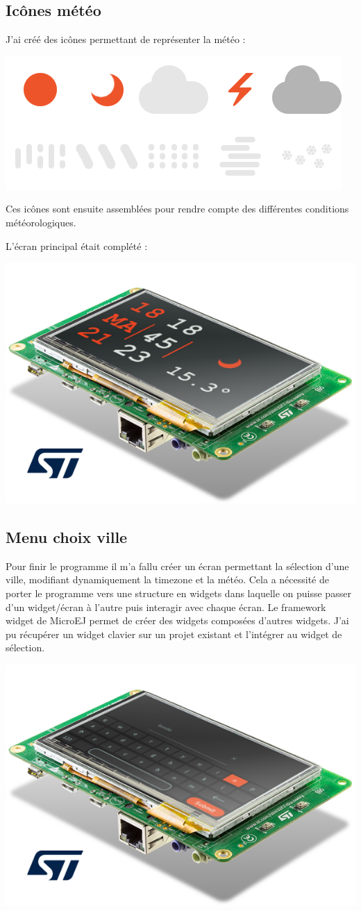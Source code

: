 \documentclass[french,a4paper,12pt]{report}
\begin{document}
\subsection{Icônes météo}

J'ai créé des icônes permettant de représenter la météo :

\begin{center}
\includegraphics[width=.5\textwidth]{./ressources/images/weathertogether.png}
\end{center}

Ces icônes sont ensuite assemblées pour rendre compte des différentes conditions météorologiques.

L'écran principal était complété :

\begin{center}
\includegraphics[width=.5\textwidth]{./ressources/schemas/inSituation.png}
\end{center}

\subsection{Menu choix ville}

Pour finir le programme il m’a fallu créer un écran permettant la sélection d’une ville, modifiant dynamiquement la timezone et la météo. Cela a nécessité de porter le programme vers une structure en widgets dans laquelle on puisse passer d’un widget/écran à l’autre puis interagir avec chaque écran.
Le framework widget de MicroEJ permet de créer des widgets composées d’autres widgets. J'ai pu récupérer un widget clavier sur un projet existant et l’intégrer au widget de sélection. 

\begin{center}
\includegraphics[width=.5\textwidth]{./ressources/schemas/inSituationSel.png}
\end{center}
\end{document}
